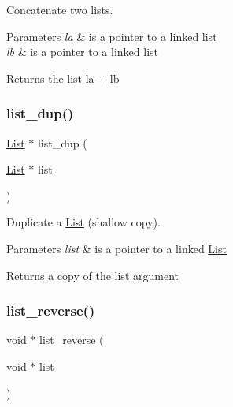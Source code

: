 Concatenate two lists. 


\begin{DoxyParams}{Parameters}
{\em la} & is a pointer to a linked list \\
\hline
{\em lb} & is a pointer to a linked list \\
\hline
\end{DoxyParams}
\begin{DoxyReturn}{Returns}
the list la + lb 
\end{DoxyReturn}
\mbox{\label{group__list__util_ga874ff33e9f0bb93fc3d7ac5ab4f3e248}} 
\subsubsection{\texorpdfstring{list\+\_\+dup()}{list\_dup()}}
{\footnotesize\ttfamily \hyperlink{structList}{List} $\ast$ list\+\_\+dup (\begin{DoxyParamCaption}\item[{\hyperlink{structList}{List} $\ast$}]{list }\end{DoxyParamCaption})}



Duplicate a \hyperlink{structList}{List} (shallow copy). 


\begin{DoxyParams}{Parameters}
{\em list} & is a pointer to a linked \hyperlink{structList}{List} \\
\hline
\end{DoxyParams}
\begin{DoxyReturn}{Returns}
a copy of the list argument 
\end{DoxyReturn}
\mbox{\label{group__list__util_ga2550a2043c99ed17cee21fc253cfa8cc}} 
\subsubsection{\texorpdfstring{list\+\_\+reverse()}{list\_reverse()}}
{\footnotesize\ttfamily void $\ast$ list\+\_\+reverse (\begin{DoxyParamCaption}\item[{void $\ast$}]{list }\end{DoxyParamCaption})}



